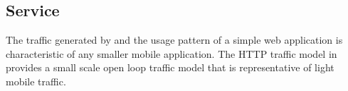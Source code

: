 \subsection{Service}
The traffic generated by and the usage pattern of a simple web application is characteristic of any smaller mobile application. The HTTP traffic model in \cite{liu2001traffic} provides a small scale open loop traffic model that is representative of light mobile traffic.